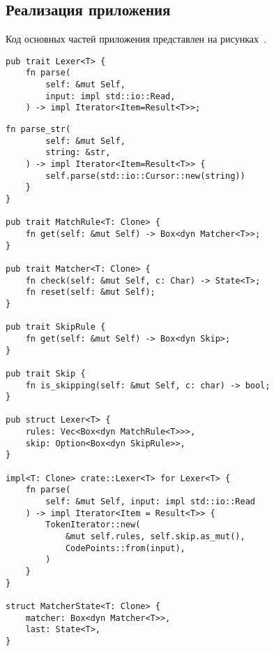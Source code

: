 \subsection{Реализация приложения}

Код основных частей приложения представлен на
рисунках~.

\begin{lstlisting}[caption={Типаж лексического анализатора и его стандартная реализация (часть 1)}, label={lst:rust_lexer1}]
pub trait Lexer<T> {
    fn parse(
        self: &mut Self,
        input: impl std::io::Read,
    ) -> impl Iterator<Item=Result<T>>;
\end{lstlisting}
\clearpage
\begin{lstlisting}[caption={Типаж лексического анализатора и его стандартная реализация (часть 2)}, label={lst:rust_lexer2}]
    fn parse_str(
        self: &mut Self,
        string: &str,
    ) -> impl Iterator<Item=Result<T>> {
        self.parse(std::io::Cursor::new(string))
    }
}

pub trait MatchRule<T: Clone> {
    fn get(self: &mut Self) -> Box<dyn Matcher<T>>;
}

pub trait Matcher<T: Clone> {
    fn check(self: &mut Self, c: Char) -> State<T>;
    fn reset(self: &mut Self);
}

pub trait SkipRule {
    fn get(self: &mut Self) -> Box<dyn Skip>;
}

pub trait Skip {
    fn is_skipping(self: &mut Self, c: char) -> bool;
}

pub struct Lexer<T> {
    rules: Vec<Box<dyn MatchRule<T>>>,
    skip: Option<Box<dyn SkipRule>>,
}

impl<T: Clone> crate::Lexer<T> for Lexer<T> {
    fn parse(
        self: &mut Self, input: impl std::io::Read
    ) -> impl Iterator<Item = Result<T>> {
        TokenIterator::new(
            &mut self.rules, self.skip.as_mut(),
            CodePoints::from(input),
        )
    }
}

struct MatcherState<T: Clone> {
    matcher: Box<dyn Matcher<T>>,
    last: State<T>,
}
\end{lstlisting}
\clearpage
